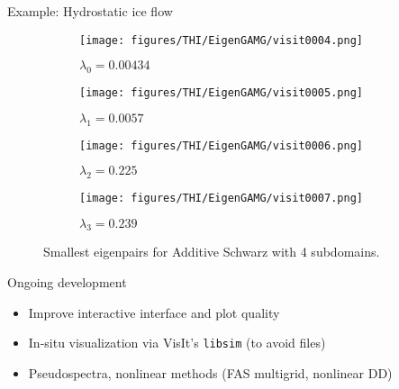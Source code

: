 \documentclass[final,t]{beamer}
\begin{document}
\begin{frame}[fragile]{}
\begin{columns}
\begin{column}{0.49\textwidth}
\begin{block}{Example: Hydrostatic ice flow}
        \begin{figure}
          \centering
          \begin{subfigure}{0.49\textwidth}
            \centering
            \texttt{[image: figures/THI/EigenGAMG/visit0004.png]}
            \caption{$\lambda_0 = 0.00434$}
          \end{subfigure}
          \begin{subfigure}{0.49\textwidth}
            \centering
            \texttt{[image: figures/THI/EigenGAMG/visit0005.png]}
            \caption{$\lambda_1 = 0.0057$}
          \end{subfigure}
          \begin{subfigure}{0.49\textwidth}
            \centering
            \texttt{[image: figures/THI/EigenGAMG/visit0006.png]}
            \caption{$\lambda_2 = 0.225$}
          \end{subfigure}
          \begin{subfigure}{0.49\textwidth}
            \centering
            \texttt{[image: figures/THI/EigenGAMG/visit0007.png]}
            \caption{$\lambda_3 = 0.239$}
          \end{subfigure}
          \caption{Smallest eigenpairs for Additive Schwarz with 4 subdomains.}
        \end{figure}
      \end{block}

      \vspace{-2em}
      \begin{block}{Ongoing development}
        \begin{itemize}
        \item Improve interactive interface and plot quality
        \item In-situ visualization via VisIt's \texttt{libsim} (to avoid files)
        \item Pseudospectra, nonlinear methods (FAS multigrid, nonlinear DD)
        \end{itemize}
      \end{block}


\end{column}
\end{columns}
\end{frame}
\end{document}
